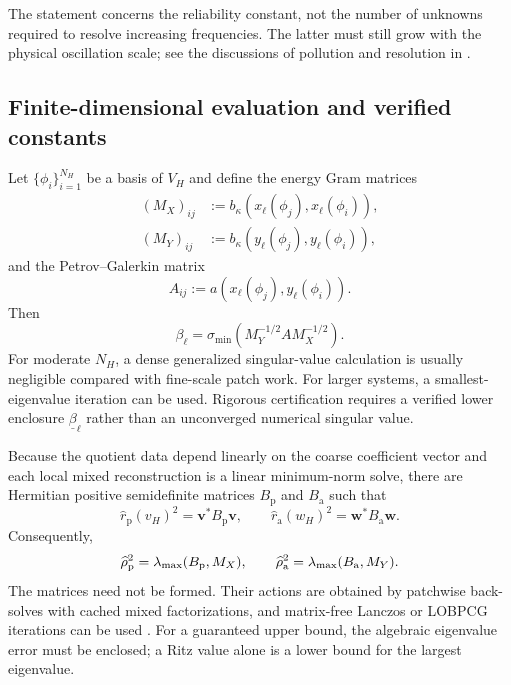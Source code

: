 The statement concerns the reliability constant, not the number of
unknowns required to resolve increasing frequencies.  The latter must
still grow with the physical oscillation scale; see the discussions of
pollution and resolution in
\cite{BabuskaIhlenburgStrouboulisGangaraj1997a,MelenkSauter2011,
Peterseim2017}.

\subsection{Finite-dimensional evaluation and verified constants}
\label{sec:algebraic-certificate}

Let $\{\phi_i\}_{i=1}^{N_H}$ be a basis of $V_H$ and define the energy
Gram matrices
\begin{align}
  (M_X)_{ij}
  &:=b_\kappa(x_\ell(\phi_j),x_\ell(\phi_i)),
  \label{eq:MX}\\
  (M_Y)_{ij}
  &:=b_\kappa(y_\ell(\phi_j),y_\ell(\phi_i)),
  \label{eq:MY}
\end{align}
and the Petrov--Galerkin matrix
\begin{equation}
\label{eq:lod-matrix}
  A_{ij}:=a(x_\ell(\phi_j),y_\ell(\phi_i)).
\end{equation}
Then
\begin{equation}
\label{eq:beta-matrix}
  \beta_\ell
  =\sigma_{\min}(M_Y^{-1/2}AM_X^{-1/2}).
\end{equation}
For moderate $N_H$, a dense generalized singular-value calculation is
usually negligible compared with fine-scale patch work.  For larger
systems, a smallest-eigenvalue iteration can be used.  Rigorous
certification requires a verified lower enclosure
$\underline\beta_\ell$ rather than an unconverged numerical singular
value.

Because the quotient data depend linearly on the coarse coefficient
vector and each local mixed reconstruction is a linear minimum-norm solve,
there are Hermitian positive semidefinite matrices $B_{\mathrm p}$ and
$B_{\mathrm a}$ such that
\begin{equation}
\label{eq:defect-quadratic-forms}
  \widehat r_{\mathrm p}(v_H)^2=\mathbf v^*B_{\mathrm p}\mathbf v,
  \qquad
  \widehat r_{\mathrm a}(w_H)^2=\mathbf w^*B_{\mathrm a}\mathbf w.
\end{equation}
Consequently,
\begin{equation}
\label{eq:defect-eigenproblems}
  \widehat\rho_{\mathrm p}^2=\lambda_{\max}(B_{\mathrm p},M_X),
  \qquad
  \widehat\rho_{\mathrm a}^2=\lambda_{\max}(B_{\mathrm a},M_Y).
\end{equation}
The matrices need not be formed.  Their actions are obtained by patchwise
back-solves with cached mixed factorizations, and matrix-free Lanczos or
LOBPCG iterations can be used \cite{Knyazev2001}.  For a guaranteed upper
bound, the algebraic eigenvalue error must be enclosed; a Ritz value alone
is a lower bound for the largest eigenvalue.

